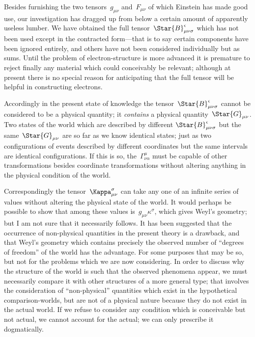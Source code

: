 \documentclass[12pt]{book}
\begin{document}
Besides furnishing the two tensors~$g_{\mu\nu}$ and~$F_{\mu\nu}$ of which Einstein has
made good use, our investigation has dragged up from below a certain
amount of apparently useless lumber. We have obtained the full tensor~$\Star{B}_{\mu\nu\sigma}^{\epsilon}$
which has not been used except in the contracted form---that is to say
certain components have been ignored entirely, and others have not been
considered individually but as sums. Until the problem of electron-structure
is more advanced it is premature to reject finally any material which could
conceivably be relevant; although at present there is no special reason for
anticipating that the full tensor will be helpful in constructing electrons.

Accordingly in the present state of knowledge the tensor~$\Star{B}_{\mu\nu\sigma}^{\epsilon}$ cannot
be considered to be a physical quantity; it \emph{contains} a physical quantity~$\Star{G}_{\mu\nu}$.
Two states of the world which are described by different $\Star{B}_{\mu\nu\sigma}^{\epsilon}$ but the
same~$\Star{G}_{\mu\nu}$ are so far as we know identical states; just as two configurations
of events described by different coordinates but the same intervals are
identical configurations. If this is so, the~$\Gamma_{\nu\alpha}^{\mu}$ must be capable of other transformations
besides coordinate transformations without altering anything in
the physical condition of the world.

Correspondingly the tensor~$\Kappa_{\mu\nu}^{\sigma}$ can take any one of an infinite series of
values without altering the physical state of the world. It would perhaps be
possible to show that among these values is~$g_{\mu\nu} \kappa^{\sigma}$, which gives Weyl's geometry;
but I am not sure that it necessarily follows. It has been suggested
that the occurrence of non-physical quantities in the present theory is a
drawback, and that Weyl's geometry which contains precisely the observed
number of ``degrees of freedom'' of the world has the advantage. For some
purposes that may be so, but not for the problems which we are now considering.
In order to discuss why the structure of the world is such that the
observed phenomena appear, we must necessarily compare it with other
structures of a more general type; that involves the consideration of ``non-physical''
quantities which exist in the hypothetical comparison-worlds, but
are not of a physical nature because they do not exist in the actual world.
If we refuse to consider any condition which is conceivable but not actual,
we cannot account for the actual; we can only prescribe it dogmatically.
\end{document}

